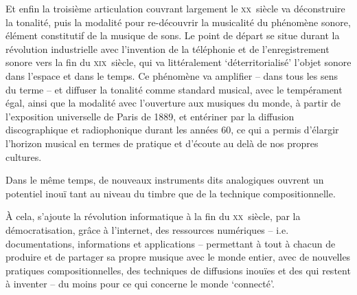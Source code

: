\documentclass{article}
\begin{document}
Et enfin la troisième articulation couvrant largement le \textsc{xx}\ieme ~siècle va déconstruire %
la tonalité, puis la modalité pour re-découvrir la musicalité du phénomène sonore, élément constitutif de la musique de sons. Le point de départ se situe durant la révolution industrielle avec l'invention de la téléphonie et de l'enregistrement sonore vers la fin du \textsc{xix}\ieme ~siècle, qui va littéralement `déterritorialisé' %
 l'objet sonore dans l'espace et dans le temps. Ce phénomène va amplifier -- dans tous les sens du terme -- et %
 diffuser la tonalité comme standard musical, avec le tempérament égal, ainsi que la modalité avec l’ouverture aux musiques du monde, %
 à partir de l’exposition universelle de Paris de 1889, et entériner par la diffusion discographique et radiophonique durant les années 60, ce qui a permis d’élargir l’horizon musical en termes de pratique et d’écoute au delà de nos propres cultures.%

Dans le même temps, de nouveaux instruments dits analogiques ouvrent un potentiel inouï tant au niveau du timbre que de la technique compositionnelle.

À cela, s'ajoute la révolution informatique à la fin du \textsc{xx}\ieme ~siècle,  par la démocratisation, grâce à l'internet, des ressources numériques -- i.e. documentations, informations et applications -- permettant à tout à chacun de produire et de partager sa propre musique avec le monde entier, avec de nouvelles pratiques compositionnelles, des techniques de diffusions inouïes et des qui restent à inventer -- du moins pour ce qui concerne le monde `connecté'.
\end{document}
